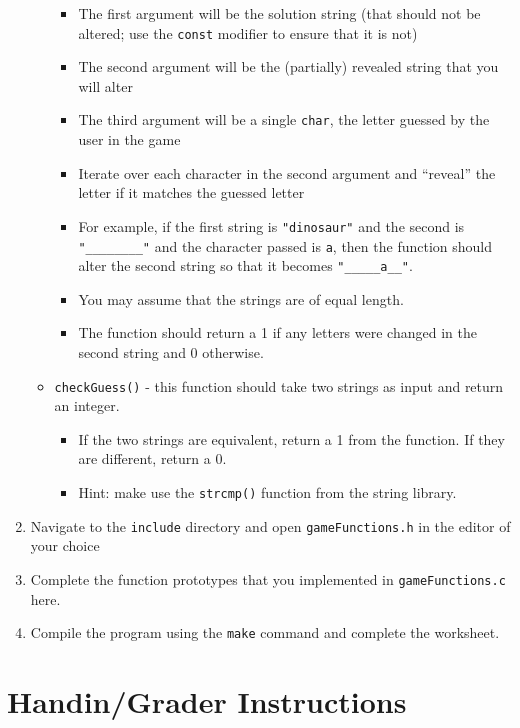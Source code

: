\documentclass[12pt]{scrartcl}
\begin{document}
\begin{enumerate}
\begin{itemize}
	  \begin{itemize}
	    \item The first argument will be the solution string (that should
	    not be altered; use the \texttt{const} modifier to ensure
	    that it is not)
	    \item The second argument will be the (partially) revealed string
	    that you will alter
	    \item The third argument will be a single \texttt{char}, 
	    the letter guessed by the user in the game
	    \item Iterate over each character in the second argument and ``reveal''
	    the letter if it matches the guessed letter 
	    \item For example, if the first string is \texttt{"dinosaur"} 
	    and the second is \texttt{"________"} and the character passed 
	    is \texttt{a}, then the function should alter the second string 
	    so that it becomes \texttt{"_____a__"}.
	    \item You may assume that the strings are of equal length.   
	    \item The function should return a 1 if any letters were changed 
	    in the second string and 0 otherwise.
	  \end{itemize}
	  \item \texttt{checkGuess()} - this function should take 
	  two strings as input and return an integer.
	  \begin{itemize}
	    \item If the two strings are equivalent, return a 1 from the 
	    function.  If they are different, return a 0.  
	    \item Hint: make use the \texttt{strcmp()} function from 
	    the string library.
	  \end{itemize}
	\end{itemize}

  \item Navigate to the \texttt{include} directory and open 
	\texttt{gameFunctions.h} in the editor of your choice
  \item Complete the function prototypes that you implemented in 
	\texttt{gameFunctions.c} here.  
  \item Compile the program using the \texttt{make} command and 
	complete the worksheet.  
\end{enumerate}

\section{Handin/Grader Instructions}
\end{document}

